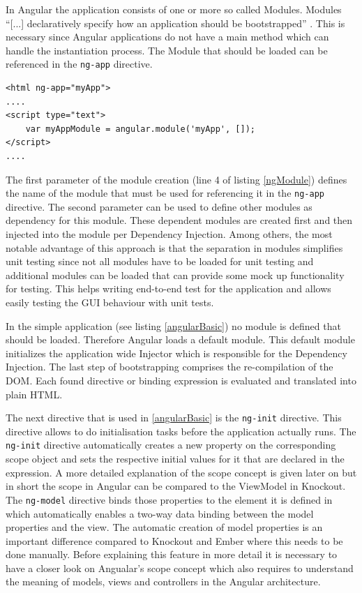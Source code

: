 In Angular the application consists of one or more so called Modules.
Modules \enquote{[...] declaratively specify how an application should be bootstrapped} \autocite{tech-ana:ng-module}.
This is necessary since Angular applications do not have a main method which can handle the instantiation process.
The Module that should be loaded can be referenced in the \texttt{ng-app} directive.

\begin{lstlisting}[label=ngModule,caption=ng-app declaration with module]
<html ng-app="myApp">
....
<script type="text">
	var myAppModule = angular.module('myApp', []);
</script>
....
\end{lstlisting}

The first parameter of the module creation (line 4 of listing \ref{ngModule}) defines the name of the module that must be used for referencing it in the \texttt{ng-app} directive.
The second parameter can be used to define other modules as dependency for this module.
These dependent modules are created first and then injected into the module per Dependency Injection.
Among others, the most notable advantage of this approach is that the separation in modules simplifies unit testing since not all modules have to be loaded for unit testing and additional modules can be loaded that can provide some mock up functionality for testing.
This helps writing end-to-end test for the application and allows easily testing the GUI behaviour with unit tests. 

In the simple application (see listing \ref{angularBasic}) no module is defined that should be loaded. 
Therefore Angular loads a default module.
This default module initializes the application wide Injector which is responsible for the Dependency Injection.
The last step of bootstrapping comprises the re-compilation of the DOM.
Each found directive or binding expression is evaluated and translated into plain HTML.

The next directive that is used in \ref{angularBasic} is the \texttt{ng-init} directive.
This directive allows to do initialisation tasks before the application actually runs.
The \texttt{ng-init} directive automatically creates a new property on the corresponding scope object and sets the respective initial values for it that are declared in the expression. 
A more detailed explanation of the scope concept is given later on but in short the scope in Angular can be compared to the ViewModel in Knockout.
The \texttt{ng-model} directive binds those properties to the element it is defined in which automatically enables a two-way data binding between the model properties and the view.
The automatic creation of model properties is an important difference compared to Knockout and Ember where this needs to be done manually.  
Before explaining this feature in more detail it is necessary to have a closer look on Angualar's scope concept which also requires to understand the meaning of models, views and controllers in the Angular architecture.

